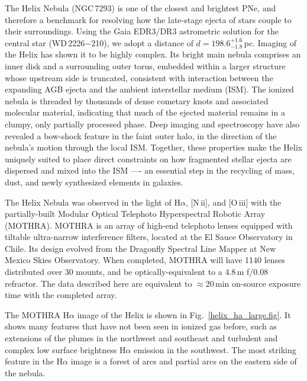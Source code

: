 \documentclass{nature_arxiv}
\begin{document}
The Helix Nebula (NGC\,7293) is one of the closest and brightest PNe, and therefore a benchmark for resolving how the late-stage ejecta of stars couple to their surroundings. Using the Gaia EDR3/DR3 astrometric solution for the central star (WD\,2226$-$210), we adopt a distance of $d = 198.6^{+1.6}_{-1.8}$\,pc.\cite{bailerjones21} Imaging of the Helix has shown it to be highly complex.
Its bright main nebula comprises an inner disk and a surrounding outer torus, embedded within a larger structure whose upstream side is truncated, consistent with interaction between the expanding AGB ejecta and the ambient interstellar medium (ISM).\cite{odell:04,meaburn:05,zhang:12}
The ionized nebula is threaded by thousands of dense cometary knots and associated molecular material, indicating that much of the ejected material remains in a clumpy, only partially processed phase.\cite{odell:04,hora06}
Deep imaging and spectroscopy have also revealed a bow-shock feature in the faint outer halo, in the direction of
the nebula’s motion through the local ISM.\cite{meaburn:05,meaburn:13}
Together, these properties make the Helix uniquely suited to place direct constraints on how fragmented stellar ejecta are dispersed and mixed into the ISM —- an essential step in the recycling of mass, dust, and newly synthesized elements in galaxies.\cite{wareing07,karakas14}






The Helix Nebula was observed in the light of
H$\alpha$, [N\,{\sc ii}], and [O\,{\sc iii}] with the partially-built Modular
Optical Telephoto Hyperspectral Robotic Array (MOTHRA).
MOTHRA is an array of high-end telephoto lenses equipped with tiltable
ultra-narrow interference filters, located at the El Sauce Observatory in
Chile. Its design evolved from the Dragonfly Spectral Line Mapper
at New Mexico Skies Observatory.\cite{lokhorst:24,chen:25}
When completed, MOTHRA will have
1140 lenses distributed over 30 mounts, and be
optically-equivalent to a 4.8\,m f/0.08 refractor.
The data described here are equivalent to $\approx 20$\,min
on-source exposure time with the completed array.

The MOTHRA H$\alpha$
image of the Helix is shown in Fig.\ \ref{helix_ha_large.fig}. It shows
many features that have not been seen in ionized gas before, such as extensions
of the plumes in the northwest and southeast\cite{odell:04,zhang:12} and
turbulent and complex low surface brightness
H$\alpha$ emission in the southwest.\cite{zhang:12}
The most striking feature in the H$\alpha$ image is a forest of arcs and
partial arcs on the eastern side of the nebula.
\end{document}
